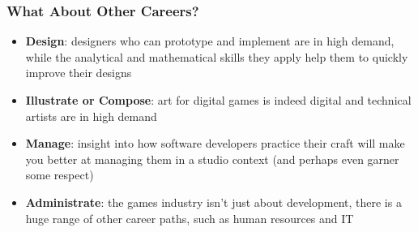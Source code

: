 \begin{frame}
	\frametitle{What About Other Careers?}
	
	\begin{itemize}
		\item 	\textbf{Design}: designers who can prototype and implement are in high demand, while the analytical and mathematical skills they apply help them to quickly improve their designs \pause
		\item 	\textbf{Illustrate or Compose}: art for digital games is indeed digital and technical artists are in high demand \pause
		\item 	\textbf{Manage}: insight into how software developers practice their craft will make you better at managing them in a studio context 
			(and perhaps even garner some respect) \pause
		\item 	\textbf{Administrate}: the games industry isn't just about development, there is a huge range of other career paths,
			such as human resources and IT
	\end{itemize}
\end{frame}

\fontsize{9pt}{7.2}\selectfont

